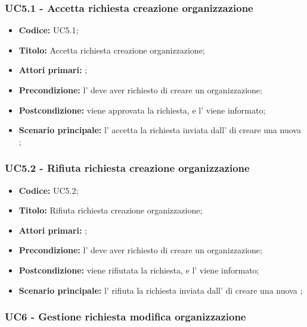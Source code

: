 \documentclass[casi-duso]{subfiles}
\begin{document}
\subsubsection{UC5.1 - Accetta richiesta creazione organizzazione}
\label{subsub:UC5.1}
\begin{itemize}
  \item \textbf{Codice:} UC5.1;
  \item \textbf{Titolo:} Accetta richiesta creazione organizzazione;
  \item \textbf{Attori primari:} ;
  \item \textbf{Precondizione:} l' deve aver richiesto di creare un organizzazione;
  \item \textbf{Postcondizione:} viene approvata la richiesta, e l' viene informato;
  \item \textbf{Scenario principale:} l' accetta la richiesta inviata dall' di creare
  una nuova ;
\end{itemize}

\subsubsection{UC5.2 - Rifiuta richiesta creazione organizzazione}
\label{subsub:UC5.2}
\begin{itemize}
  \item \textbf{Codice:} UC5.2;
  \item \textbf{Titolo:} Rifiuta richiesta creazione organizzazione;
  \item \textbf{Attori primari:} ;
  \item \textbf{Precondizione:} l' deve aver richiesto di creare un organizzazione;
  \item \textbf{Postcondizione:} viene rifiutata la richiesta, e l' viene informato;
  \item \textbf{Scenario principale:} l' rifiuta la richiesta inviata dall' di creare
  una nuova ;
\end{itemize}

\subsubsection{UC6 - Gestione richiesta modifica organizzazione}
\label{subsub:UC6}
\end{document}
